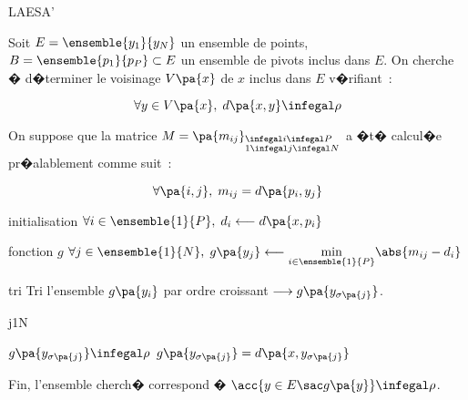             \begin{xalgorithm}{LAESA'}
            \label{space_metric_algo_laesa_prime}
            
            Soit $E = \ensemble{y_1}{y_N}$ un ensemble de points, $B = \ensemble{p_1}{p_P} \subset E$ 
            un ensemble de pivots inclus dans $E$. On cherche � d�terminer le voisinage $V\pa{x}$ de $x$ 
            inclus dans $E$ v�rifiant~:
            
                        $$
                        \forall y \in V\pa{x}, \; d\pa{x,y} \infegal \rho
                        $$
                        
            On suppose que la matrice $M = \pa{m_{ij}}_ { \begin{subarray} 1 \infegal i \infegal P \\ 
            1 \infegal j \infegal N \end{subarray} }$ a �t� calcul�e pr�alablement comme suit~:
            
                        $$
                        \forall \pa{i,j}, \; m_{ij} = d\pa{p_i, y_j}
                        $$
                        
            \begin{xalgostep}{initialisation}
                $\forall i \in \ensemble{1}{P}, \; d_i \longleftarrow d\pa{x,p_i}$
            \end{xalgostep}        
            
            \begin{xalgostep}{fonction $g$} \label{classif_laesa_prime_step_b}
                $\forall j \in \ensemble{1}{N}, \;  g\pa{y_j} \longleftarrow \underset{  i \in \ensemble{1}{P} }{\min}  \abs{ m_{ij} - d_i} $
            \end{xalgostep}
            
            \begin{xalgostep}{tri}
                Tri l'ensemble $g\pa{y_i}$ par ordre croissant $\longrightarrow g\pa{y_{\sigma\pa{j}}}$. \\
                \begin{xfor}{j}{1}{N}
                   \begin{xif}{$g\pa{y_{\sigma\pa{j}}} \infegal \rho$}
                   $g\pa{y_{\sigma\pa{j}}} = d\pa{x,y_{\sigma\pa{j}}}$
                   \end{xif}
                \end{xfor} 
                
                Fin, l'ensemble cherch� correspond � $\acc{y \in E \sac g\pa{y}} \infegal \rho$.
            \end{xalgostep}

\end{xalgorithm}


